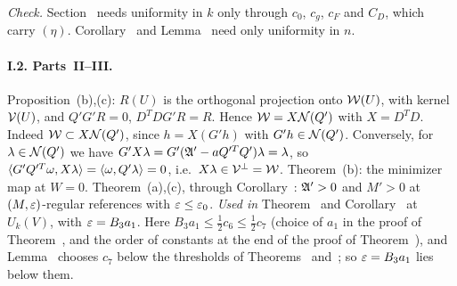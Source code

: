 \emph{Check.} Section~ needs uniformity in $k$ only through $c_0$, $c_g$, $c_F$ and $C_D$, which carry $(\eta)$. Corollary~ and Lemma~ need only uniformity in $n$.

\paragraph{I.2. Parts~II--III.} Proposition~(b),(c): $R(U)$ is the orthogonal projection onto $\mathcal W(U)$, with kernel $\mathcal V(U)$, and $Q'G'R=0$, $D^TDG'R=R$. Hence $\mathcal W=X\mathcal N(Q')$ with $X=D^TD$. Indeed $\mathcal W\subset X\mathcal N(Q')$, since $h=X(G'h)$ with $G'h\in\mathcal N(Q')$. Conversely, for $\lambda\in\mathcal N(Q')$ we have $G'X\lambda=G'(\mathfrak A'-aQ'^TQ')\lambda=\lambda$, so $\langle G'Q'^T\omega,X\lambda\rangle=\langle \omega,Q'\lambda\rangle=0$, i.e.\ $X\lambda\in\mathcal V^\perp=\mathcal W$. Theorem~(b): the minimizer map at $W=0$. Theorem~(a),(c), through Corollary~: $\mathfrak A'>0$ and $M'>0$ at $(M,\varepsilon)$-regular references with $\varepsilon\le\varepsilon_0$. \emph{Used in} Theorem~ and Corollary~ at $U_k(V)$, with $\varepsilon=B_3a_1$. Here $B_3a_1\le\frac12c_6\le\frac12c_7$ (choice of $a_1$ in the proof of Theorem~, and the order of constants at the end of the proof of Theorem~), and Lemma~ chooses $c_7$ below the thresholds of Theorems~ and~; so $\varepsilon=B_3a_1$ lies below them.

